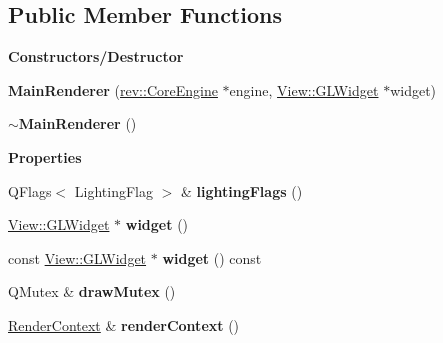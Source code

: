 \subsection*{Public Member Functions}
\begin{Indent}\textbf{ Constructors/\+Destructor}\par
\begin{DoxyCompactItemize}
\item 
\mbox{\label{classrev_1_1_main_renderer_ab9e211d3f59b64d15e9496fc7ca48118}} 
{\bfseries Main\+Renderer} (\mbox{\hyperlink{classrev_1_1_core_engine}{rev\+::\+Core\+Engine}} $\ast$engine, \mbox{\hyperlink{classrev_1_1_view_1_1_g_l_widget}{View\+::\+G\+L\+Widget}} $\ast$widget)
\item 
\mbox{\label{classrev_1_1_main_renderer_ac8f2e2b420cee1c1b070f3e32e205f96}} 
{\bfseries $\sim$\+Main\+Renderer} ()
\end{DoxyCompactItemize}
\end{Indent}
\begin{Indent}\textbf{ Properties}\par
\begin{DoxyCompactItemize}
\item 
\mbox{\label{classrev_1_1_main_renderer_acb5358222276c4785602b4167c62e43f}} 
Q\+Flags$<$ Lighting\+Flag $>$ \& {\bfseries lighting\+Flags} ()
\item 
\mbox{\label{classrev_1_1_main_renderer_af45fee565d8d25dffdf016b79c4dcb4b}} 
\mbox{\hyperlink{classrev_1_1_view_1_1_g_l_widget}{View\+::\+G\+L\+Widget}} $\ast$ {\bfseries widget} ()
\item 
\mbox{\label{classrev_1_1_main_renderer_adcddd1c2e4f1510e7c33a4005adb0c72}} 
const \mbox{\hyperlink{classrev_1_1_view_1_1_g_l_widget}{View\+::\+G\+L\+Widget}} $\ast$ {\bfseries widget} () const
\item 
\mbox{\label{classrev_1_1_main_renderer_a0b84f192078535355c962c2eef6d5aba}} 
Q\+Mutex \& {\bfseries draw\+Mutex} ()
\item 
\mbox{\label{classrev_1_1_main_renderer_a51adf76b7344651eff4026e2075dbbb0}} 
\mbox{\hyperlink{classrev_1_1_render_context}{Render\+Context}} \& {\bfseries render\+Context} ()
\end{DoxyCompactItemize}
\end{Indent}
